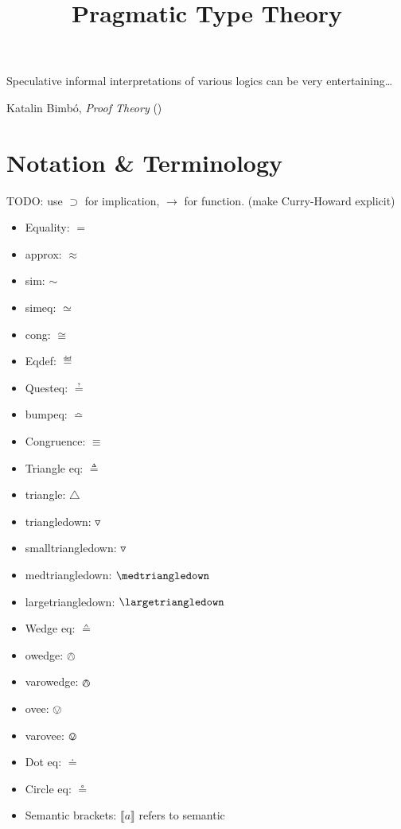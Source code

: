 \documentclass{article}
\begin{document}
\title{Pragmatic Type Theory}
\maketitle
\tableofcontents
\vfill
\large

\epigraph{Speculative informal interpretations of various logics can be very entertaining\ldots}
         {Katalin Bimbó, \textit{Proof Theory} (\parencite{bimbo2014proof})}

\section{Notation \& Terminology}

TODO: use \(\supset\) for implication, \(\rightarrow\) for function.
(make Curry-Howard explicit)

\begin{itemize}
\item Equality: \(=\)
\item approx: \(\approx\)
\item sim: \(\sim\)
\item simeq: \(\simeq\)
\item cong: \(\cong\)
\item Eqdef: \(\eqdef\)
\item Questeq: \(\questeq\)
\item bumpeq: \(\bumpeq\)
\item Congruence: \(\equiv\)
\item Triangle eq: \(\triangleq\)
\item triangle: \(\triangle\)
\item triangledown: \(\triangledown\)
\item smalltriangledown: \(\smalltriangledown\)
\item medtriangledown: \(\medtriangledown\)
\item largetriangledown: \(\largetriangledown\)
\item Wedge eq: \(\wedgeq\)
\item owedge: \(\owedge\)
\item varowedge: \(\varowedge\)
\item ovee: \(\ovee\)
\item varovee: \(\varovee\)
\item Dot eq: \(\doteq\)
\item Circle eq: \(\circeq\)
\item Semantic brackets: \(\llbracket a\rrbracket\) refers to semantic

\end{itemize}
\end{document}
